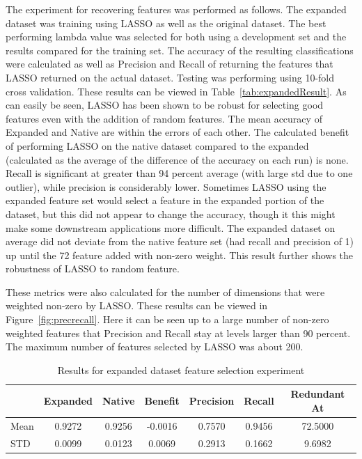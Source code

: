 The experiment for recovering features was performed as follows. The expanded dataset was training using LASSO as well as the original dataset. The best performing lambda value was selected for both using a development set and the results compared for the training set. The accuracy of the resulting classifications were calculated as well as Precision and Recall of returning the features that LASSO returned on the actual dataset. Testing was performing using 10-fold cross validation. These results can be viewed in Table~\ref{tab:expandedResult}. As can easily be seen, LASSO has been shown to be robust for selecting good features even with the addition of random features. The mean accuracy of Expanded and Native are within the errors of each other. The calculated benefit of performing LASSO on the native dataset compared to the expanded (calculated as the average of the difference of the accuracy on each run) is none. Recall is significant at greater than 94 percent average (with large std due to one outlier), while precision is considerably lower. Sometimes LASSO using the expanded feature set would select a feature in the expanded portion of the dataset, but this did not appear to change the accuracy, though it this might make some downstream applications more difficult. The expanded dataset on average did not deviate from the native feature set (had recall and precision of 1) up until the 72 feature added with non-zero weight. This result further shows the robustness of LASSO to random feature.

These metrics were also calculated for the number of dimensions that were weighted non-zero by LASSO. These results can be viewed in Figure~\ref{fig:precrecall}. Here it can be seen up to a large number of non-zero weighted features that Precision and Recall stay at levels larger than 90 percent. The maximum number of features selected by LASSO was about 200.

\begin{table}
\begin{tabular}{lcccccc}
\hline
&Expanded&Native&Benefit&Precision&Recall&Redundant At
\\
\hline
Mean&0.9272&0.9256&-0.0016&0.7570&0.9456&72.5000 \\
STD&0.0099&0.0123&0.0069&0.2913&0.1662&9.6982
\end{tabular}
\caption{Results for expanded dataset feature selection experiment}
\label{expandedResult}
\end{table}